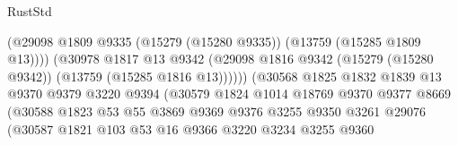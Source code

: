 \begin{lexlean}{RustStd}
\begin{coremodule}
                                            (@29098
                                              @1809
                                              @9335
                                              (@15279 (@15280 @9335))
                                              (@13759 (@15285 @1809 @13))))
                                          (@30978
                                            @1817
                                            @13
                                            @9342
                                            (@29098
                                              @1816
                                              @9342
                                              (@15279 (@15280 @9342))
                                              (@13759 (@15285 @1816 @13))))))
                                      (@30568
                                        @1825
                                        @1832
                                        @1839
                                        @13
                                        @9370
                                        @9379
                                        @3220
                                        @9394
                                        (@30579
                                          @1824
                                          @1014
                                          @18769
                                          @9370
                                          @9377
                                          @8669
                                          (@30588
                                            @1823
                                            @53
                                            @55
                                            @3869
                                            @9369
                                            @9376
                                            @3255
                                            @9350
                                            @3261
                                            @29076
                                            (@30587
                                              @1821
                                              @103
                                              @53
                                              @16
                                              @9366
                                              @3220
                                              @3234
                                              @3255
                                              @9360

\end{coremodule}
\end{lexlean}
